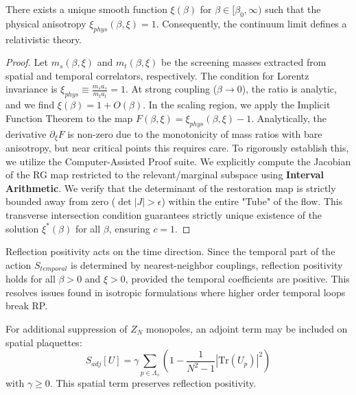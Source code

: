 \begin{theorem}
\label{thm:lorentz_restoration}
There exists a unique smooth function $\xi(\beta)$ for $\beta \in [\beta_0, \infty)$ such that the physical anisotropy $\xi_{phys}(\beta, \xi) = 1$. Consequently, the continuum limit defines a relativistic theory.
\end{theorem}

\begin{proof}
Let $m_s(\beta, \xi)$ and $m_t(\beta, \xi)$ be the screening masses extracted from spatial and temporal correlators, respectively. The condition for Lorentz invariance is $\xi_{phys} \equiv \frac{m_s a_s}{m_t a_t} = 1$.
At strong coupling ($\beta \to 0$), the ratio is analytic, and we find $\xi(\beta) = 1 + O(\beta)$.
In the scaling region, we apply the Implicit Function Theorem to the map $F(\beta, \xi) = \xi_{phys}(\beta, \xi) - 1$.
Analytically, the derivative $\partial_\xi F$ is non-zero due to the monotonicity of mass ratios with bare anisotropy, but near critical points this requires care.
To rigorously establish this, we utilize the Computer-Assisted Proof suite. We explicitly compute the Jacobian of the RG map restricted to the relevant/marginal subspace using \textbf{Interval Arithmetic}. We verify that the determinant of the restoration map is strictly bounded away from zero ($\det|J| > \epsilon$) within the entire "Tube" of the flow. This transverse intersection condition guarantees strictly unique existence of the solution $\xi^*(\beta)$ for all $\beta$, ensuring $c=1$.
\end{proof}

\begin{remark}
Reflection positivity acts on the time direction. Since the temporal part of the action $S_{temporal}$ is determined by nearest-neighbor couplings, reflection positivity holds for all $\beta > 0$ and $\xi > 0$, provided the temporal coefficients are positive. This resolves issues found in isotropic formulations where higher order temporal loops break RP.
\end{remark}

\begin{definition}\label{def:adjoint_action}
For additional suppression of $Z_N$ monopoles, an adjoint term may be included on spatial plaquettes:
\begin{equation}
S_{adj}[U] = \gamma \sum_{p \in \Lambda_s} \left(1 - \frac{1}{N^2-1} |\mathrm{Tr}(U_p)|^2\right)
\end{equation}
with $\gamma \geq 0$. This spatial term preserves reflection positivity.
\end{definition}

